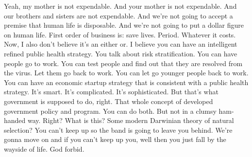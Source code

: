 Yeah, my mother is not expendable. And your mother is not expendable. And our
brothers and sisters are not expendable. And we're not going to accept a premise
that human life is disposable. And we're not going to put a dollar figure on
human life. First order of business is: save lives. Period. Whatever it costs.
Now, I also don't believe it's an either or. I believe you can have an
intelligent refined public health strategy. You talk about risk stratification.
You can have people go to work. You can test people and find out that they are
resolved from the virus. Let them go back to work. You can let go younger people
back to work. You can have an economic startup strategy that is consistent with a
public health strategy. It's smart. It's complicated. It's sophisticated. But
that's what government is supposed to do, right. That whole concept of developed
government policy and program. You can do both. But not in a clumsy ham-handed
way. Right?  What is this? Some modern Darwinian theory
of natural selection? You can't keep up so the band is going to leave you behind.
We're gonna move on and if you can't keep up you, well then you just fall by the
wayside of life. God forbid.
